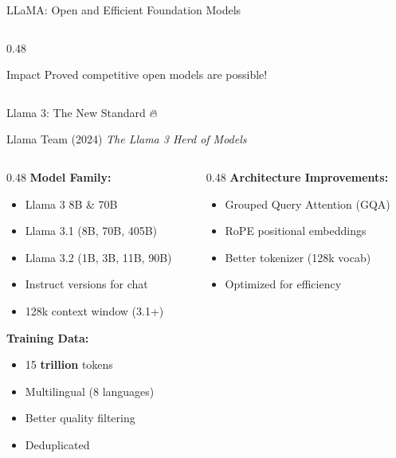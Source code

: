 \documentclass[aspectratio=169]{beamer}
\begin{document}
\begin{frame}{LLaMA: Open and Efficient Foundation Models 🦙}
\begin{columns}[T]
\begin{column}{0.48\textwidth}
\vspace{0.5em}

\begin{alertblock}{Impact}
Proved competitive open models are possible!
\end{alertblock}
\end{column}
\end{columns}
\end{frame}

\begin{frame}{Llama 3: The New Standard 🔥}
\begin{block}{Llama Team (2024)}
\textit{The Llama 3 Herd of Models}
\end{block}

\vspace{0.5em}

\begin{columns}[T]
\begin{column}{0.48\textwidth}
\textbf{Model Family:}
\begin{itemize}
    \item Llama 3 8B \& 70B
    \item Llama 3.1 (8B, 70B, 405B)
    \item Llama 3.2 (1B, 3B, 11B, 90B)
    \item Instruct versions for chat
    \item \alert{128k context window} (3.1+)
\end{itemize}

\vspace{0.5em}

\textbf{Training Data:}
\begin{itemize}
    \item 15 \textbf{trillion} tokens
    \item Multilingual (8 languages)
    \item Better quality filtering
    \item Deduplicated
\end{itemize}
\end{column}

\begin{column}{0.48\textwidth}
\textbf{Architecture Improvements:}
\begin{itemize}
    \item Grouped Query Attention (GQA)
    \item RoPE positional embeddings
    \item Better tokenizer (128k vocab)
    \item Optimized for efficiency
\end{itemize}


\end{column}
\end{columns}
\end{frame}
\end{document}
